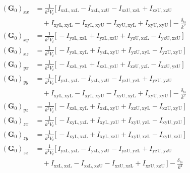 \begin{align*}
(\mathbf{G}_0)_{xx} &= \frac{1}{k^2 V_t}\bigl[\, I_{\mathrm{xzL},\mathrm{xzL}} - I_{\mathrm{xzL},\mathrm{xzU}} - I_{\mathrm{xzU},\mathrm{xzL}} + I_{\mathrm{xzU},\mathrm{xzU}} \\ &\quad + I_{\mathrm{xyL},\mathrm{xyL}} - I_{\mathrm{xyL},\mathrm{xyU}} - I_{\mathrm{xyU},\mathrm{xyL}} + I_{\mathrm{xyU},\mathrm{xyU}} \,\bigr] - \frac{\delta_{ts}}{k^2} \\
(\mathbf{G}_0)_{xy} &= \frac{1}{k^2 V_t}\bigl[\, - I_{\mathrm{yzL},\mathrm{xzL}} + I_{\mathrm{yzL},\mathrm{xzU}} + I_{\mathrm{yzU},\mathrm{xzL}} - I_{\mathrm{yzU},\mathrm{xzU}} \,\bigr] \\
(\mathbf{G}_0)_{xz} &= \frac{1}{k^2 V_t}\bigl[\, - I_{\mathrm{yzL},\mathrm{xyL}} + I_{\mathrm{yzL},\mathrm{xyU}} + I_{\mathrm{yzU},\mathrm{xyL}} - I_{\mathrm{yzU},\mathrm{xyU}} \,\bigr] \\
(\mathbf{G}_0)_{yx} &= \frac{1}{k^2 V_t}\bigl[\, - I_{\mathrm{xzL},\mathrm{yzL}} + I_{\mathrm{xzL},\mathrm{yzU}} + I_{\mathrm{xzU},\mathrm{yzL}} - I_{\mathrm{xzU},\mathrm{yzU}} \,\bigr] \\
(\mathbf{G}_0)_{yy} &= \frac{1}{k^2 V_t}\bigl[\, I_{\mathrm{yzL},\mathrm{yzL}} - I_{\mathrm{yzL},\mathrm{yzU}} - I_{\mathrm{yzU},\mathrm{yzL}} + I_{\mathrm{yzU},\mathrm{yzU}} \\ &\quad + I_{\mathrm{xyL},\mathrm{xyL}} - I_{\mathrm{xyL},\mathrm{xyU}} - I_{\mathrm{xyU},\mathrm{xyL}} + I_{\mathrm{xyU},\mathrm{xyU}} \,\bigr] - \frac{\delta_{ts}}{k^2} \\
(\mathbf{G}_0)_{yz} &= \frac{1}{k^2 V_t}\bigl[\, - I_{\mathrm{xzL},\mathrm{xyL}} + I_{\mathrm{xzL},\mathrm{xyU}} + I_{\mathrm{xzU},\mathrm{xyL}} - I_{\mathrm{xzU},\mathrm{xyU}} \,\bigr] \\
(\mathbf{G}_0)_{zx} &= \frac{1}{k^2 V_t}\bigl[\, - I_{\mathrm{xyL},\mathrm{yzL}} + I_{\mathrm{xyL},\mathrm{yzU}} + I_{\mathrm{xyU},\mathrm{yzL}} - I_{\mathrm{xyU},\mathrm{yzU}} \,\bigr] \\
(\mathbf{G}_0)_{zy} &= \frac{1}{k^2 V_t}\bigl[\, - I_{\mathrm{xyL},\mathrm{xzL}} + I_{\mathrm{xyL},\mathrm{xzU}} + I_{\mathrm{xyU},\mathrm{xzL}} - I_{\mathrm{xyU},\mathrm{xzU}} \,\bigr] \\
(\mathbf{G}_0)_{zz} &= \frac{1}{k^2 V_t}\bigl[\, I_{\mathrm{yzL},\mathrm{yzL}} - I_{\mathrm{yzL},\mathrm{yzU}} - I_{\mathrm{yzU},\mathrm{yzL}} + I_{\mathrm{yzU},\mathrm{yzU}} \\ &\quad + I_{\mathrm{xzL},\mathrm{xzL}} - I_{\mathrm{xzL},\mathrm{xzU}} - I_{\mathrm{xzU},\mathrm{xzL}} + I_{\mathrm{xzU},\mathrm{xzU}} \,\bigr] - \frac{\delta_{ts}}{k^2}
\end{align*}
